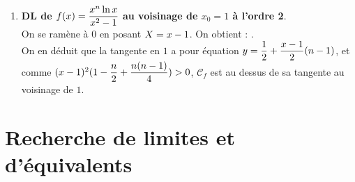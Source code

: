 \documentclass[a4paper, 11pt,reqno]{article}
\begin{document}
\begin{correction}
\begin{enumerate}
		\item \textbf{DL de $f(x)=\displaystyle\frac{x^n\ln{x}}{x^2-1}$ au voisinage de $x_0=1$ \`a l'ordre 2}.\\
		      On se ram\`ene \`a $0$ en posant $\displaystyle X=x-1$. On obtient :
		      .\\
		      On en d\'eduit que la tangente en $1$ a pour \'equation $y=\displaystyle\frac{1}{2} +\displaystyle\frac{x-1}{2}(n-1)$, et comme $(x-1)^2(1-\displaystyle\frac{n}{2} +\displaystyle\frac{n(n-1)}{4}) > 0$, $\mathcal{C}_f$ est au dessus de sa tangente au voisinage de $1$.
	\end{enumerate}
\end{correction}



\noindent\section{\large{Recherche de limites et d'\'equivalents}}
\end{document}
